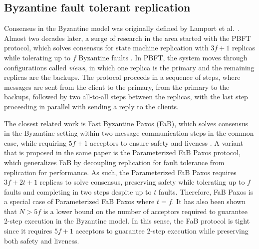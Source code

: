 \subsection{Byzantine fault tolerant replication} \label{Non-Crash}
Consensus in the Byzantine model was originally defined by Lamport et al.~\cite{LSP82}. Almost two decades later, a surge of research in the area started with the PBFT protocol, which solves consensus for state machine replication with $3f+1$ replicas while tolerating up to $f$ Byzantine faults \cite{CL99}. In PBFT, the system moves through configurations called \textit{views}, in which one replica is the primary and the remaining replicas are the backups. The protocol proceeds in a sequence of steps, where messages are sent from the client to the primary, from the primary to the backups, followed by two all-to-all steps between the replicas, with the last step proceeding in parallel with sending a reply to the clients. \par
The closest related work is Fast Byzantine Paxos (FaB), which solves consensus in the Byzantine setting within two message communication steps in the common case, while requiring $5f+1$ acceptors to ensure safety and liveness \cite{Martin2006}. A variant that is proposed in the same paper is the Parameterized FaB Paxos protocol, which generalizes FaB by decoupling replication for fault tolerance from replication for performance. As such, the Parameterized FaB Paxos requires $3f+2t+1$ replicas to solve consensus, preserving safety while tolerating up to $f$ faults and completing in two steps despite up to $t$ faults. Therefore, FaB Paxos is a special case of Parameterized FaB Paxos where $t=f$. It has also been shown that $N>5f$ is a lower bound on the number of acceptors required to guarantee 2-step execution in the Byzantine model. In this sense, the FaB protocol is tight since it requires $5f+1$ acceptors to guarantee 2-step execution while preserving both safety and liveness. \par
